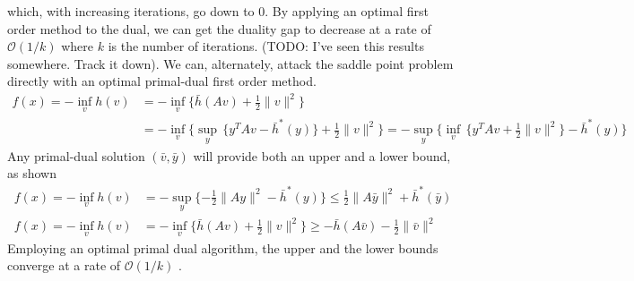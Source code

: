 which, with increasing iterations, go down to $0$.  By applying an optimal
first order method to the dual, we can get the  duality gap to decrease at a
rate of $\mathcal{O}(1/k)$ where $k$ is the  number of iterations. (TODO: I've
seen this results somewhere. Track it  down). We can, alternately, attack the
saddle point problem directly with an optimal primal-dual first order method.
\begin{align*}
f(x) = -\inf_v h(v) & = -\inf_{v}\{\bar{h}(Av)+\tfrac{1}{2}\|v\|^{2}\} \\
&=-\inf_{v}\Big\{\sup_{y}\,\{y^{T}Av-\bar{h}^{*}(y)\}+\tfrac{1}{2}\|v\|^{2}\Big\} 
 =-\sup_{y}\Big\{\inf_{v}\,\{y^{T}Av+\tfrac{1}{2}\|v\|^{2}\}-\bar{h}^{*}(y)\Big\}
\end{align*}
Any primal-dual solution $(\bar{v},\bar{y})$ will provide both an upper
and a lower bound, as shown
\begin{align*}
f(x) = -\inf_v h(v) 
&=-\sup_{y} \{-\tfrac{1}{2}\|Ay\|^{2}-\bar{h}^{*}(y) \}\leq\tfrac{1}{2}\|A\bar{y}\|^{2}+\bar{h}^{*}(\bar{y})\\
f(x) = -\inf_v h(v) &=-\inf_{v} \{\bar{h}(Av)+\tfrac{1}{2}\|v\|^{2} \} \geq -\bar{h}(A\bar{v})-\tfrac{1}{2}\|\bar{v}\|^{2}
\end{align*}
Employing an optimal primal dual algorithm, the upper and the lower bounds
converge at a rate of $\mathcal{O}(1/k)$ \cite{chen2014optimal}.

